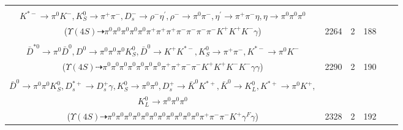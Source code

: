 \documentclass[landscape]{article}
\newcounter{rownumbers}
\newcommand\rn{\stepcounter{rownumbers}\arabic{rownumbers}}
\newcommand{\EOLP}{\\ \hline} %
\newcommand{\topoTags}[1]{#1} %
\begin{document}
\begin{longtable}{clcccc}
\rn & \makecell[l]{ $ 
\Upsilon(4S) \rightarrow B^{0} \bar{B}^{0} ,
B^{0} \rightarrow K^{*} D_{s}^{+} D_{s}^{*-} ,
\bar{B}^{0} \rightarrow \pi^{+} K^{*-} ,
K^{*} \rightarrow \pi^{-} K^{+} ,
D_{s}^{+} \rightarrow K_{S}^{0} K^{+} ,
D_{s}^{*-} \rightarrow D_{s}^{-} \gamma ,
$ \\ $
K^{*-} \rightarrow \pi^{0} K^{-} ,
K_{S}^{0} \rightarrow \pi^{+} \pi^{-} ,
D_{s}^{-} \rightarrow \rho^{-} \eta^{\prime} ,
\rho^{-} \rightarrow \pi^{0} \pi^{-} ,
\eta^{\prime} \rightarrow \pi^{+} \pi^{-} \eta ,
\eta \rightarrow \pi^{0} \pi^{0} \pi^{0} 
$ \\ ($
\Upsilon(4S) \dashrightarrow \pi^{0} \pi^{0} \pi^{0} \pi^{0} \pi^{0} \pi^{+} \pi^{+} \pi^{+} \pi^{-} \pi^{-} \pi^{-} \pi^{-} K^{+} K^{+} K^{-} \gamma 
$) } & \topoTags{2264 & }2 & 188 \EOLP

\rn & \makecell[l]{ $ 
\Upsilon(4S) \rightarrow B^{0} \bar{B}^{0} ,
B^{0} \rightarrow \rho^{-} K^{*+} \gamma \gamma ,
\bar{B}^{0} \rightarrow K^{-} D^{*+} \bar{D}^{*0} ,
\rho^{-} \rightarrow \pi^{0} \pi^{-} ,
K^{*+} \rightarrow \pi^{0} K^{+} ,
D^{*+} \rightarrow \pi^{+} D^{0} ,
$ \\ $
\bar{D}^{*0} \rightarrow \pi^{0} \bar{D}^{0} ,
D^{0} \rightarrow \pi^{0} \pi^{0} \pi^{0} K_{S}^{0} ,
\bar{D}^{0} \rightarrow K^{+} K^{*-} ,
K_{S}^{0} \rightarrow \pi^{+} \pi^{-} ,
K^{*-} \rightarrow \pi^{0} K^{-} 
$ \\ ($
\Upsilon(4S) \dashrightarrow \pi^{0} \pi^{0} \pi^{0} \pi^{0} \pi^{0} \pi^{0} \pi^{0} \pi^{+} \pi^{+} \pi^{-} \pi^{-} K^{+} K^{+} K^{-} K^{-} \gamma \gamma 
$) } & \topoTags{2290 & }2 & 190 \EOLP

\rn & \makecell[l]{ $ 
\Upsilon(4S) \rightarrow B^{0} \bar{B}^{0} ,
B^{0} \rightarrow D^{*-} D_{s1}^{\prime+} ,
\bar{B}^{0} \rightarrow \pi^{-} D^{+} \gamma^{F} ,
D^{*-} \rightarrow \pi^{-} \bar{D}^{0} ,
D_{s1}^{\prime+} \rightarrow \pi^{0} D_{s}^{*+} ,
D^{+} \rightarrow \pi^{0} \pi^{0} \pi^{+} ,
$ \\ $
\bar{D}^{0} \rightarrow \pi^{0} \pi^{0} K_{S}^{0} ,
D_{s}^{*+} \rightarrow D_{s}^{+} \gamma ,
K_{S}^{0} \rightarrow \pi^{0} \pi^{0} ,
D_{s}^{+} \rightarrow \bar{K}^{0} K^{*+} ,
\bar{K}^{0} \rightarrow K_{L}^{0} ,
K^{*+} \rightarrow \pi^{0} K^{+} ,
$ \\ $
K_{L}^{0} \rightarrow \pi^{0} \pi^{0} \pi^{0} 
$ \\ ($
\Upsilon(4S) \dashrightarrow \pi^{0} \pi^{0} \pi^{0} \pi^{0} \pi^{0} \pi^{0} \pi^{0} \pi^{0} \pi^{0} \pi^{0} \pi^{0} \pi^{+} \pi^{-} \pi^{-} K^{+} \gamma^{F} \gamma 
$) } & \topoTags{2328 & }2 & 192 \EOLP


\end{longtable}
\end{document}
